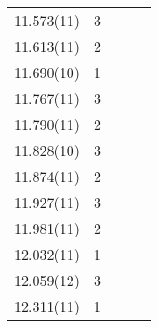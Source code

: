 \begin{center}
\begin{longtable}{cc cc c}
     11.573(11)   & 3 &   &   &   \\
     11.613(11)   & 2 &   &   &   \\
   11.690(10)     & 1 &   &   &   \\
   11.767(11)     & 3 &   &   &   \\
   11.790(11)     & 2 &   &   &   \\
   11.828(10)     & 3 &   &   &   \\
     11.874(11)   & 2 &   &   &   \\
    11.927(11)    & 3 &   &   &   \\
    11.981(11)    & 2 &   &   &   \\
     12.032(11)   & 1 &   &   &   \\
     12.059(12)   & 3 &   &   &   \\
    12.311(11)    & 1 &   &   &   \\




    \end{longtable}
\end{center}



